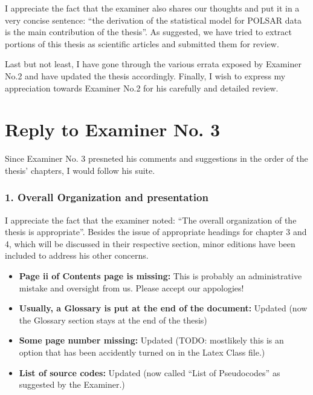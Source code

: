 \documentclass{article}
\begin{document}
I appreciate the fact that the examiner also shares our thoughts and put it in a very concise sentence: ``the derivation of the statistical model for POLSAR data is the main contribution of the thesis''.
As suggested, we have tried to extract portions of this thesis as scientific articles and submitted them for review.

Last but not least, I have gone through the various errata exposed by Examiner No.2 and have updated the thesis accordingly.
Finally, I wish to express my appreciation towards Examiner No.2 for his carefully and detailed review.
  
\section*{Reply to Examiner No. 3}

\begin{replyheader}
\end{replyheader}  

Since Examiner No. 3 presneted his comments and suggestions in the order of the thesis' chapters, 
  I would follow his suite.

\subsubsection*{1. Overall Organization and presentation}

I appreciate the fact that the examiner noted: ``The overall organization of the thesis is appropriate''.
Besides the issue of appropriate headings for chapter 3 and 4, which will be discussed in their respective section, minor editions have been included to address his other concerns.

\begin{itemize}
  \item \textbf{Page ii of Contents page is missing:} This is probably an administrative mistake and oversight from us. Please accept our appologies!
  \item \textbf{Usually, a Glossary is put at the end of the document: } Updated (now the Glossary section stays at the end of the thesis)
  \item \textbf{Some page number missing: } Updated (TODO: mostlikely this is an option that has been accidently turned on in the Latex Class file.)
  \item \textbf{List of source codes: } Updated (now called ``List of Pseudocodes'' as suggested by the Examiner.)
\end{itemize}
\end{document}
